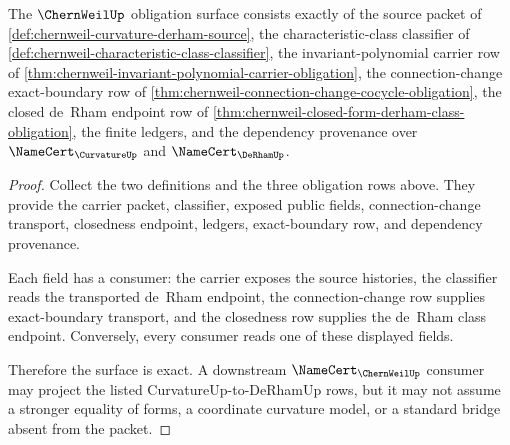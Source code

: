 \begin{theorem}
\label{thm:chernweil-namecert-obligation-surface}
The $\ChernWeilUp$ obligation surface consists exactly of the source packet of \autoref{def:chernweil-curvature-derham-source}, the characteristic-class classifier of \autoref{def:chernweil-characteristic-class-classifier}, the invariant-polynomial carrier row of \autoref{thm:chernweil-invariant-polynomial-carrier-obligation}, the connection-change exact-boundary row of \autoref{thm:chernweil-connection-change-cocycle-obligation}, the closed de~Rham endpoint row of \autoref{thm:chernweil-closed-form-derham-class-obligation}, the finite ledgers, and the dependency provenance over $\NameCert_{\CurvatureUp}$ and $\NameCert_{\DeRhamUp}$.
\end{theorem}
\begin{proof}
Collect the two definitions and the three obligation rows above. They provide the carrier packet, classifier, exposed public fields, connection-change transport, closedness endpoint, ledgers, exact-boundary row, and dependency provenance.

Each field has a consumer: the carrier exposes the source histories, the classifier reads the transported de~Rham endpoint, the connection-change row supplies exact-boundary transport, and the closedness row supplies the de~Rham class endpoint. Conversely, every consumer reads one of these displayed fields.

Therefore the surface is exact. A downstream $\NameCert_{\ChernWeilUp}$ consumer may project the listed CurvatureUp-to-DeRhamUp rows, but it may not assume a stronger equality of forms, a coordinate curvature model, or a standard bridge absent from the packet.
\end{proof}

